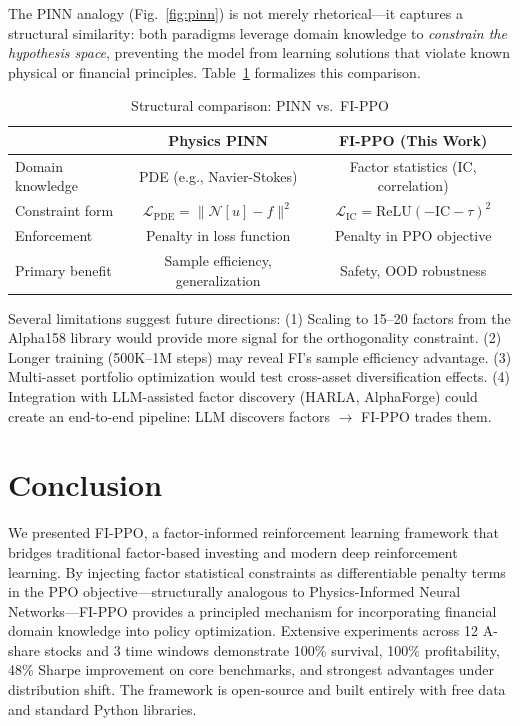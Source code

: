 \documentclass[11pt,a4paper]{article}
\begin{document}
The PINN analogy (Fig.~\ref{fig:pinn}) is not merely rhetorical---it captures a structural similarity: both paradigms leverage domain knowledge to \emph{constrain the hypothesis space}, preventing the model from learning solutions that violate known physical or financial principles. Table~\ref{tab:pinn} formalizes this comparison.

\begin{table}[H]
\centering
\caption{Structural comparison: PINN vs.\ FI-PPO}
\label{tab:pinn}
\begin{tabular}{lcc}
\toprule
& \textbf{Physics PINN} & \textbf{FI-PPO (This Work)} \\
\midrule
Domain knowledge  & PDE (e.g., Navier-Stokes) & Factor statistics (IC, correlation) \\
Constraint form   & $\mathcal{L}_{\text{PDE}} = \|\mathcal{N}[u] - f\|^2$ & $\mathcal{L}_{\text{IC}} = \text{ReLU}(-\text{IC} - \tau)^2$ \\
Enforcement       & Penalty in loss function & Penalty in PPO objective \\
Primary benefit   & Sample efficiency, generalization & Safety, OOD robustness \\
\bottomrule
\end{tabular}
\end{table}

Several limitations suggest future directions: (1) Scaling to 15--20 factors from the Alpha158 library would provide more signal for the orthogonality constraint. (2) Longer training (500K--1M steps) may reveal FI's sample efficiency advantage. (3) Multi-asset portfolio optimization would test cross-asset diversification effects. (4) Integration with LLM-assisted factor discovery (HARLA, AlphaForge) could create an end-to-end pipeline: LLM discovers factors $\to$ FI-PPO trades them.

\section{Conclusion}
\label{sec:conclusion}

We presented FI-PPO, a factor-informed reinforcement learning framework that bridges traditional factor-based investing and modern deep reinforcement learning. By injecting factor statistical constraints as differentiable penalty terms in the PPO objective---structurally analogous to Physics-Informed Neural Networks---FI-PPO provides a principled mechanism for incorporating financial domain knowledge into policy optimization. Extensive experiments across 12 A-share stocks and 3 time windows demonstrate 100\% survival, 100\% profitability, 48\% Sharpe improvement on core benchmarks, and strongest advantages under distribution shift. The framework is open-source and built entirely with free data and standard Python libraries.
\end{document}
